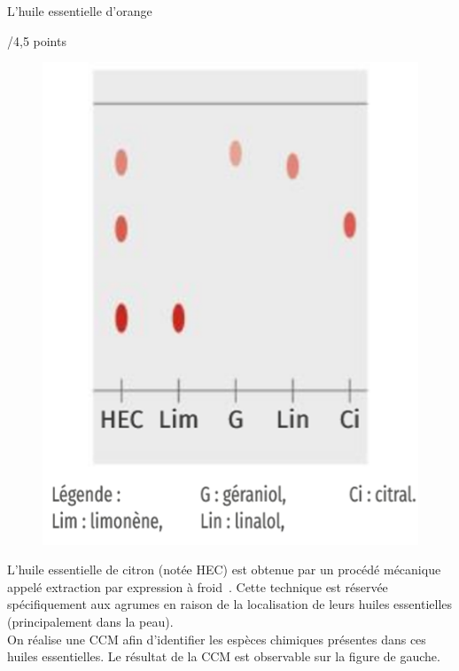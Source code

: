 \begin{doc}{L'huile essentielle d'orange\begin{Large}
    /4,5 points
\end{Large}}
\begin{figure}
\vspace{-1cm}
    \centering
      \includegraphics[scale=0.65]{Images/DS/DS1/CCm_HEO_3.png}
  \end{figure}
L'huile essentielle de citron (notée HEC) est obtenue par un procédé mécanique appelé \og extraction par expression à froid\fg~. Cette technique est réservée spécifiquement aux agrumes en raison de la localisation de leurs huiles essentielles (principalement dans la peau).\\
On réalise une CCM afin d'identifier les espèces chimiques présentes dans ces huiles essentielles. Le résultat de la CCM est observable sur la figure de gauche.\\


\end{doc}
